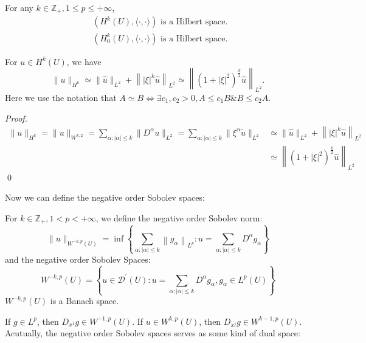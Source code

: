 \begin{theorem}
For any $k \in \mathbb{Z}_{+}, 1 \leq p \leq+\infty$,
    $$
    \begin{aligned}
    &\left(H^{k}(U),\langle\cdot, \cdot\rangle\right) \text { is a Hilbert space. } \\
    &\left(H_{0}^{k}(U),\langle\cdot, \cdot\rangle\right) \text { is a Hilbert space. }
    \end{aligned}
    $$
\end{theorem}

\begin{theorem}
For $u \in H^{k}(U)$, we have
$$
\|u\|_{H^{k}} \simeq\|\hat{u}\|_{L^{2}}+\left\||\xi|^{k} \hat{u}\right\|_{L^{2}} \simeq\left\|\left(1+\left|\xi\right|^{2}\right)^{\frac{k}{2}} \hat{u}\right\|_{L^{2}} .
$$
Here we use the notation that $A \simeq B \Leftrightarrow \exists c_{1}, c_{2}>0, A \leq c_{1} B \& B \leq c_{2} A$.
\end{theorem}
\begin{proof}
\begin{align*}
    \|u\|_{H^k} = \|u\|_{W^{k,2}} = \sum_{\alpha: |\alpha| \le k}\|D^\alpha u\|_{L^2}  = \sum_{\alpha: |\alpha| \le k}\|\xi^{\alpha} \tilde u\|_{L^2}& \simeq \|\hat{u}\|_{L^{2}}+\left\||\xi|^{k} \hat{u}\right\|_{L^{2}} \\& \simeq\left\|\left(1+\left|\xi\right|^{2}\right)^{\frac{k}{2}} \hat{u}\right\|_{L^{2}}
\end{align*}
\qed 
\end{proof}

Now we can define the negative order Sobolev spaces: 

\begin{definition}
For $k \in \mathbb{Z}_{+}, 1<p<+\infty$, we define the negative order Sobolev norm:
$$
\|u\|_{W^{-k, p}(U)}=\inf \left\{\sum_{\alpha:|\alpha| \leq k}\left\|g_{\alpha}\right\|_{L^{p}}: u=\sum_{\alpha:|\alpha| \leq k} D^{\alpha} g_{\alpha}\right\}
$$
and the negative order Sobolev Spaces:
$$
W^{-k, p}(U)=\left\{u \in \mathcal{D}^{\prime}(U): u=\sum_{\alpha:|\alpha| \leq k} D^{\alpha} g_{\alpha}, g_{\alpha} \in L^{p}(U)\right\}
$$
$W^{-k, p}(U)$ is a Banach space. 
\end{definition}

If $g \in L^{p}$, then $D_{x^{1}} g \in W^{-1, p}(U)$. If $u \in W^{k, p}(U)$, then $D_{x^{j}} g \in W^{k-1, p}(U)$. Acutually, the negative order Sobolev spaces serves as some kind of dual space:

